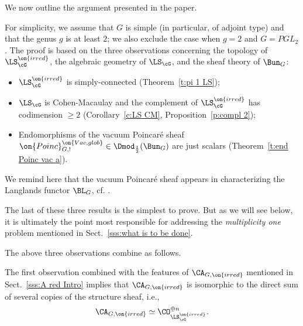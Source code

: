\documentclass[9pt]{amsart}
\theoremstyle{remark}
\theoremstyle{definition}
\theoremstyle{remark}
\newcommand{\thmref}[1]{Theorem~\ref{#1}}
\newcommand{\secref}[1]{Sect.~\ref{#1}}
\newcommand{\propref}[1]{Proposition~\ref{#1}}
\newcommand{\corref}[1]{Corollary~\ref{#1}}
\numberwithin{equation}{section}
\begin{document}
\sssec{}\label{sss:features}

We now outline the argument presented in the paper.

\medskip 

For simplicity, we assume that $G$ is simple (in particular, of adjoint type) and 
that the genus $g$ is at least $2$; 
we also exclude the case when $g=2$ and $G=PGL_2$. 
The proof is based on the three
observations concerning the topology of $\LS_{\cG}^{\on{irred}}$, 
the algebraic geometry of $\LS_{\cG}$, and the sheaf theory of
$\Bun_G$: 

\medskip

\begin{itemize} 

\item $\LS_\cG^{\on{irred}}$ is simply-connected (\thmref{t:pi 1 LS});

\smallskip

\item $\LS_\cG$ is Cohen-Macaulay 
and the complement of $\LS_\cG^{\on{irred}}$ has codimension $\geq 2$
(\corref{c:LS CM}, \propref{p:compl 2});

\smallskip

\item Endomorphisms of the vacuum Poincar\'e sheaf
$\on{Poinc}^{\on{Vac,glob}}_{G,!}\in \Dmod_{\frac{1}{2}}(\Bun_G)$
are just scalars (\thmref{t:end Poinc vac a}).

\end{itemize}

\medskip

We remind here that the vacuum Poincar\'e sheaf appears in characterizing
the Langlands functor $\BL_G$, cf. \cite[Sect. 1.4]{GLC1}.  

\medskip 

The last of these three results is the simplest to prove. 
But as we will see below, it is ultimately the 
point most responsible for addressing the \emph{multiplicity one} problem
mentioned in \secref{sss:what is to be done}. 
 
\sssec{}

The above three observations combine as follows.

\medskip

The first observation combined with the features of
$\CA_{G,\on{irred}}$ mentioned in \secref{sss:A red Intro} implies that 
$\CA_{G,\on{irred}}$ is isomorphic to the direct sum of several copies of the structure sheaf, i.e.,
$$\CA_{G,\on{irred}} \simeq \CO^{\oplus n}_{\LS_\cG^{\on{irred}}}.$$
\end{document}
